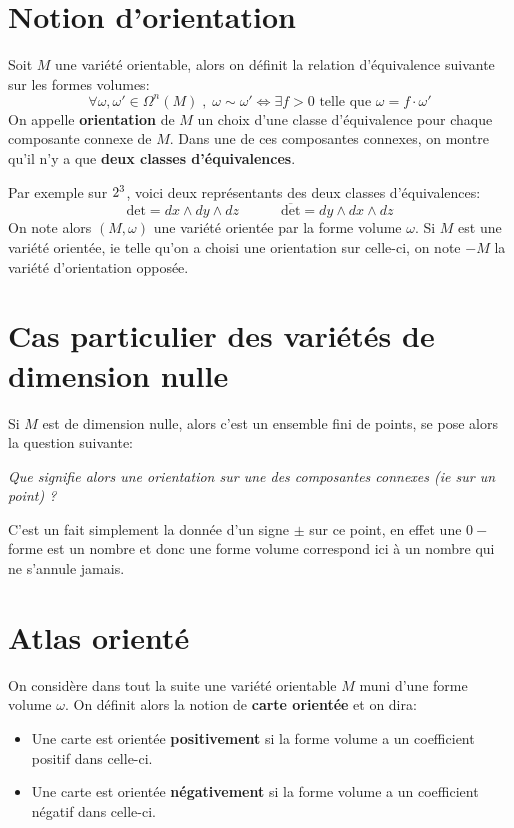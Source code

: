    \section{Notion d'orientation}
      Soit \( M \) une variété orientable, alors on définit la relation d'équivalence suivante sur les formes volumes:
      \[ 
         \forall \omega, \omega' \in \Omega^n(M) \; , \; \omega \sim \omega' \iff \exists f > 0 \text{ telle que } \omega = f \cdot \omega' 
      \]
      On appelle \textbf{orientation} de \( M \) un choix d'une classe d'équivalence pour chaque composante connexe de \( M \). Dans une de ces composantes connexes, on montre qu'il n'y a que \textbf{deux classes d'équivalences}.

      Par exemple sur \( 2^3 \), voici deux représentants des deux classes d'équivalences:
      \[ 
         \text{det} = dx \wedge dy \wedge dz \quad\quad\quad \overline{\text{det}} = dy \wedge dx \wedge dz
      \]
      On note alors \( (M, \omega) \) une variété orientée par la forme volume \( \omega \). Si \( M \) est une variété orientée, ie telle qu'on a choisi une orientation sur celle-ci, on note \( -M \) la variété d'orientation opposée. 
   \section{Cas particulier des variétés de dimension nulle}
      Si \( M \) est de dimension nulle, alors c'est un ensemble fini de points, se pose alors la question suivante: 
      \begin{center}
         \textit{Que signifie alors une orientation sur une des composantes connexes (ie sur un point) ?}
      \end{center}
      C'est un fait simplement la donnée d'un signe \( \pm \) sur ce point, en effet une \( 0-\)forme est un nombre et donc une forme volume correspond ici à un nombre qui ne s'annule jamais.
   \section{Atlas orienté}
      On considère dans tout la suite une variété orientable \( M \) muni d'une forme volume \( \omega \). On définit alors la notion de \textbf{carte orientée} et on dira:
      \begin{itemize}
         \item Une carte est orientée \textbf{positivement} si la forme volume a un coefficient positif dans celle-ci.
         \item Une carte est orientée \textbf{négativement} si la forme volume a un coefficient négatif dans celle-ci.
      \end{itemize}

